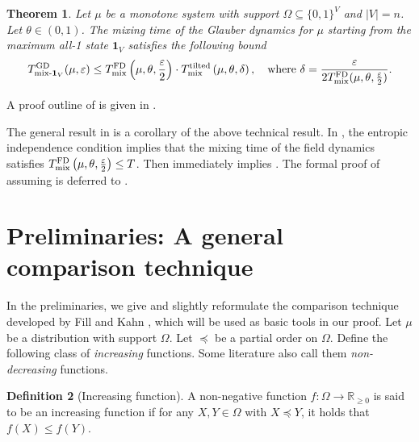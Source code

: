 \documentclass[11pt,a4paper]{article}
\renewcommand{\epsilon}{\varepsilon}
\newcommand{\mixtl}{T_{\textnormal{mix}}^{\textnormal{tilted}}}
\newcommand{\mixmax}{T_{\textnormal{mix-}\*1_V}^{\textnormal{GD}}}
\newcommand{\mixfd}{T_{\textnormal{mix}}^{\textnormal{FD}}}
\newtheorem{theorem}{Theorem}[section]
\theoremstyle{definition}
\newtheorem{definition}[theorem]{Definition}
\newcommand{\tuple}[1]{\left(#1\right)} \newcommand{\eps}{\varepsilon}
\newcommand{\tp}{\tuple}
\def\*#1{\mathbf{#1}} %
\begin{document}
\begin{theorem}\label{thm:FD-comparison}
    Let $\mu$ be a monotone system with support $\Omega \subseteq \{0,1\}^V$ and $|V| = n$. Let $\theta \in (0,1)$. 
    The mixing time of the Glauber dynamics for $\mu$ starting from the maximum all-1 state $\*1_V$ satisfies the following bound
    \begin{align*}
        \mixmax(\mu,\epsilon) \leq \mixfd\tp{\mu,\theta,\frac{\epsilon}{2}} \cdot \mixtl\tp{\mu,\theta,\delta}, \quad \text{where } \delta = \frac{\epsilon}{2 \mixfd(\mu,\theta,\frac{\epsilon}{2})}.
    \end{align*}
    \end{theorem}

    A proof outline of  is given in .

    The general result in  is a corollary of the above technical result.
    In , the entropic independence condition implies that the mixing time of the field dynamics satisfies $\mixfd\tp{\mu,\theta,\frac{\epsilon}{2}} \leq T$. 
    Then  immediately implies . 
    The formal proof of  assuming  is deferred to .









\section{Preliminaries: A general comparison technique}\label{sec:preliminaries}

In the preliminaries,
we give and slightly reformulate the comparison technique developed by Fill and Kahn \cite{FillK13}, which will be used as basic tools in our proof.
Let $\mu$ be a distribution with support $\Omega$. 
Let $\preceq$ be a partial order on $\Omega$. 
Define the following class of \emph{increasing} functions. Some literature also call them \emph{non-decreasing} functions.
\begin{definition}[Increasing  function]\label{def:increasing-function}
    A non-negative function $f:\Omega \to \mathbb{R}_{\geq 0}$ is said to be an increasing function if for any $X,Y \in \Omega$ with $X\preceq Y$, it holds that $f(X)\leq f(Y)$.
\end{definition}
\end{document}
